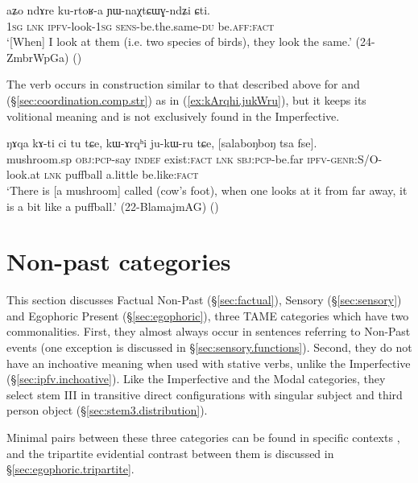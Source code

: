 \begin{exe}
\ex \label{ex:kurtoRa.YWnaXCtWGndZi}
\gll  aʑo ndɤre ku-rtoʁ-a ɲɯ-naχtɕɯɣ-ndʑi ɕti. \\
\textsc{1sg} \textsc{lnk} \textsc{ipfv}-look-\textsc{1sg} \textsc{sens}-be.the.same-\textsc{du} be.\textsc{aff}:\textsc{fact} \\
\glt `[When] I look at them (i.e. two species of birds), they look the same.' (24-ZmbrWpGa)
()
\end{exe}

The verb  occurs in construction similar to that described above for  and  (§\ref{sec:coordination.comp.str}) as in (\ref{ex:kArqhi.jukWru}), but it keeps its volitional meaning and is not exclusively found in the Imperfective.

\begin{exe}
\ex \label{ex:kArqhi.jukWru}
\gll ŋɤqa kɤ-ti ci tu tɕe, kɯ-ɤrqʰi ju-kɯ-ru tɕe, [salaboŋboŋ tsa fse].  \\
mushroom.sp \textsc{obj}:\textsc{pcp}-say \textsc{indef} exist:\textsc{fact} \textsc{lnk} \textsc{sbj}:\textsc{pcp}-be.far \textsc{ipfv}-\textsc{genr}:S/O-look.at \textsc{lnk} puffball a.little be.like:\textsc{fact} \\
\glt `There is [a mushroom] called  (cow's foot), when one looks at it from far away, it is a bit like a puffball.' (22-BlamajmAG)
()
\end{exe}

\section{Non-past categories} \label{sec:TAME.npst}
This section discusses Factual Non-Past (§\ref{sec:factual}), Sensory (§\ref{sec:sensory}) and Egophoric Present (§\ref{sec:egophoric}), three TAME categories which have two commonalities. First, they almost always occur in sentences referring to Non-Past events (one exception is discussed in §\ref{sec:sensory.functions}). Second, they do not have an inchoative meaning when used with stative verbs, unlike the Imperfective (§\ref{sec:ipfv.inchoative}). Like the Imperfective and the Modal categories, they select stem III in transitive direct configurations with singular subject and third person object (§\ref{sec:stem3.distribution}).

Minimal pairs between these three categories can be found in specific contexts \citep{jacques19egophoric}, and the tripartite evidential contrast between them is discussed in §\ref{sec:egophoric.tripartite}.

